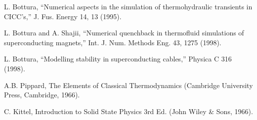 \noindent [1.22] L. Bottura, ``Numerical aspects in the simulation of thermohydraulic transients
in CICC’s,” J. Fus. Energy 14, 13 (1995).

\noindent [1.23] L. Bottura and A. Shajii, ``Numerical quenchback in thermofluid simulations of
superconducting magnets,” Int. J. Num. Methods Eng. 43, 1275 (1998).

\noindent [1.24] L. Bottura, ``Modelling stability in superconducting cables,” Physica C 316 (1998).

\noindent [1.25] A.B. Pippard, The Elements of Classical Thermodynamics (Cambridge University
Press, Cambridge, 1966).

\noindent [1.26] C. Kittel, Introduction to Solid State Physics 3rd Ed. (John Wiley \& Sons, 1966).


